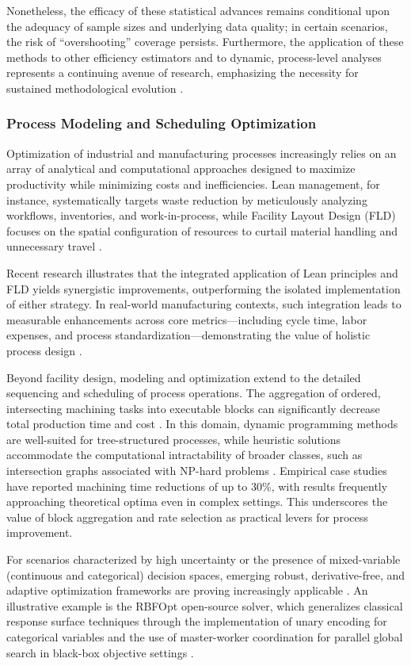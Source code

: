 Nonetheless, the efficacy of these statistical advances remains conditional upon the adequacy of sample sizes and underlying data quality; in certain scenarios, the risk of ``overshooting'' coverage persists. Furthermore, the application of these methods to other efficiency estimators and to dynamic, process-level analyses represents a continuing avenue of research, emphasizing the necessity for sustained methodological evolution \cite{ref87}.

\subsubsection{Process Modeling and Scheduling Optimization}

Optimization of industrial and manufacturing processes increasingly relies on an array of analytical and computational approaches designed to maximize productivity while minimizing costs and inefficiencies. Lean management, for instance, systematically targets waste reduction by meticulously analyzing workflows, inventories, and work-in-process, while Facility Layout Design (FLD) focuses on the spatial configuration of resources to curtail material handling and unnecessary travel \cite{ref81}.

Recent research illustrates that the integrated application of Lean principles and FLD yields synergistic improvements, outperforming the isolated implementation of either strategy. In real-world manufacturing contexts, such integration leads to measurable enhancements across core metrics—including cycle time, labor expenses, and process standardization—demonstrating the value of holistic process design \cite{ref81}.

Beyond facility design, modeling and optimization extend to the detailed sequencing and scheduling of process operations. The aggregation of ordered, intersecting machining tasks into executable blocks can significantly decrease total production time and cost \cite{ref82}. In this domain, dynamic programming methods are well-suited for tree-structured processes, while heuristic solutions accommodate the computational intractability of broader classes, such as intersection graphs associated with NP-hard problems \cite{ref82}. Empirical case studies have reported machining time reductions of up to 30\%, with results frequently approaching theoretical optima even in complex settings. This underscores the value of block aggregation and rate selection as practical levers for process improvement.

For scenarios characterized by high uncertainty or the presence of mixed-variable (continuous and categorical) decision spaces, emerging robust, derivative-free, and adaptive optimization frameworks are proving increasingly applicable \cite{ref77,ref78}. An illustrative example is the RBFOpt open-source solver, which generalizes classical response surface techniques through the implementation of unary encoding for categorical variables and the use of master-worker coordination for parallel global search in black-box objective settings \cite{ref77}.

